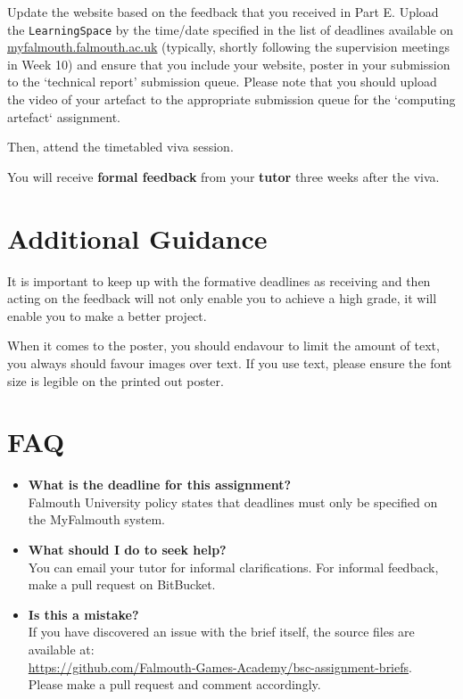 \documentclass{../../fal_assignment}
\begin{document}
Update the website based on the feedback that you received in Part E. Upload the \texttt{LearningSpace} by the time/date specified in the list of deadlines available on \url{myfalmouth.falmouth.ac.uk} (typically, shortly following the supervision meetings in Week 10) and ensure that you include your website, poster in your submission to the `technical report' submission queue. Please note that you should upload the video of your artefact to the appropriate submission queue for the `computing artefact` assignment. 

Then, attend the timetabled viva session.

You will receive \textbf{formal feedback} from your \textbf{tutor} three weeks after the viva.

\section*{Additional Guidance}

It is important to keep up with the formative deadlines as receiving and then
acting on the feedback will not only enable you to achieve a high grade, it
will enable you to make a better project.

When it comes to the poster, you should endavour to limit the amount of text,
you always should favour images over text. If you use text, please ensure the
font size is legible on the printed out poster.

\section*{FAQ}

\begin{itemize}
	\item 	\textbf{What is the deadline for this assignment?} \\ 
    		Falmouth University policy states that deadlines must only be specified on the MyFalmouth system.
    		
	\item 	\textbf{What should I do to seek help?} \\ 
    		You can email your tutor for informal clarifications. For informal feedback, make a pull request on BitBucket. 
    		
    	\item 	\textbf{Is this a mistake?} \\ 	
    		If you have discovered an issue with the brief itself, the source files are available at: \\
    		\url{https://github.com/Falmouth-Games-Academy/bsc-assignment-briefs}.\\
    		 Please make a pull request and comment accordingly.
\end{itemize}
\end{document}
